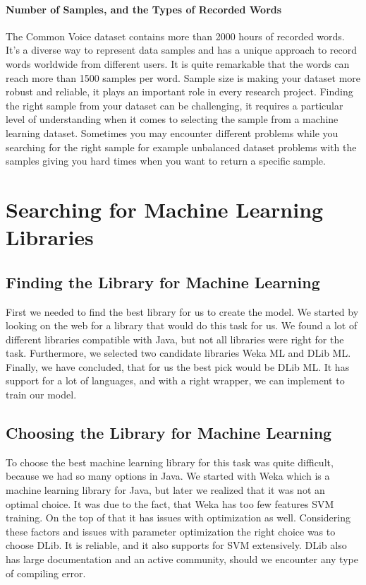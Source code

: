 \documentclass[english,12pt,oneside,a4paper]{article}
\begin{document}
        \paragraph{Number of Samples, and the Types of Recorded Words}
		The Common Voice dataset contains more than 2000 hours of recorded words. It's a diverse way to represent data samples and has a unique approach to record words worldwide from different users. It is quite remarkable that the words can reach more than 1500 samples per word. 
		Sample size is making your dataset more robust and reliable, it plays an important role in every research project. Finding the right sample  from your dataset can be challenging, it requires a particular level of  understanding when it comes to selecting the sample from a machine learning dataset. Sometimes you may encounter different problems while you searching for the right sample for example unbalanced dataset problems with the samples giving you hard times when you want to return a specific sample.
		
		\section{Searching for Machine Learning Libraries}
		
		\subsection{Finding the Library for Machine Learning}
		First we needed to find the best library for us to create the model.
		We started by looking on the web for a library that would do this task for us. We found a lot of different libraries compatible with Java, but not all libraries were right for the task. Furthermore, we selected two candidate libraries Weka ML and DLib ML.
		Finally, we have concluded, that for us the best pick would be DLib ML. It has support for a lot of languages, and with a right wrapper, we can implement to train our model.
		\subsection{Choosing the Library for Machine Learning}
		To choose the best machine learning library for this task was quite difficult, because we had so many options in Java. We started with Weka which is a machine learning library for Java, but later we realized that it was not an optimal choice. It was due to the fact, that Weka has too few features SVM training. On the top of that it has issues with optimization as well. Considering these factors and issues with parameter optimization the right choice was to choose DLib. It is reliable, and it also supports for SVM extensively. DLib also has  large documentation and an active community, should we encounter any type of compiling error.
		
\end{document}

